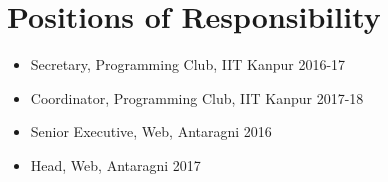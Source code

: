 \section*{Positions of Responsibility}

\begin{itemize}
\item Secretary, Programming Club, IIT Kanpur 2016-17
\item Coordinator, Programming Club, IIT Kanpur 2017-18
\item Senior Executive, Web, Antaragni 2016
\item Head, Web, Antaragni 2017
\end{itemize}
